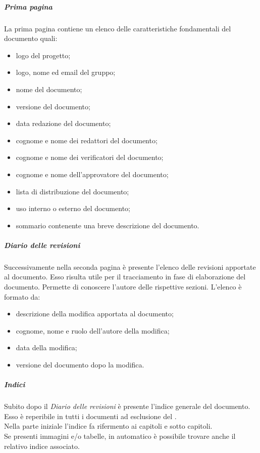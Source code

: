 				\subparagraph{Prima pagina}
				La prima pagina contiene un elenco delle caratteristiche fondamentali del documento quali:
				\begin{itemize}
					\item logo del progetto;
					\item logo, nome ed email del gruppo; 
					\item nome del documento;
					\item versione del documento;
					\item data redazione del documento;
					\item cognome e nome dei redattori del documento;
					\item cognome e nome dei verificatori del documento;
					\item cognome e nome dell'approvatore del documento;
					\item lista di distribuzione del documento;
					\item uso interno o esterno del documento;
					\item sommario contenente una breve descrizione del documento.
				\end{itemize}
			
				\subparagraph{Diario delle revisioni}
				Successivamente nella seconda pagina è presente l'elenco delle revisioni apportate al documento. Esso risulta utile per il tracciamento in fase di elaborazione del documento. Permette di conoscere l'autore delle rispettive sezioni. L'elenco è formato da:
				\begin{itemize}
					\item descrizione della modifica apportata al documento;
					\item cognome, nome e ruolo dell'autore della modifica;
					\item data della modifica;
					\item versione del documento dopo la modifica.
				\end{itemize}

				\subparagraph{Indici}
				Subito dopo il \emph{Diario delle revisioni} è presente l'indice generale del documento. Esso è reperibile in tutti i documenti ad esclusione del \docGlossary.\\
				Nella parte iniziale l'indice fa rifermento ai capitoli e sotto capitoli.\\
				Se presenti immagini e/o tabelle, in automatico è possibile trovare anche il relativo indice associato.
			
